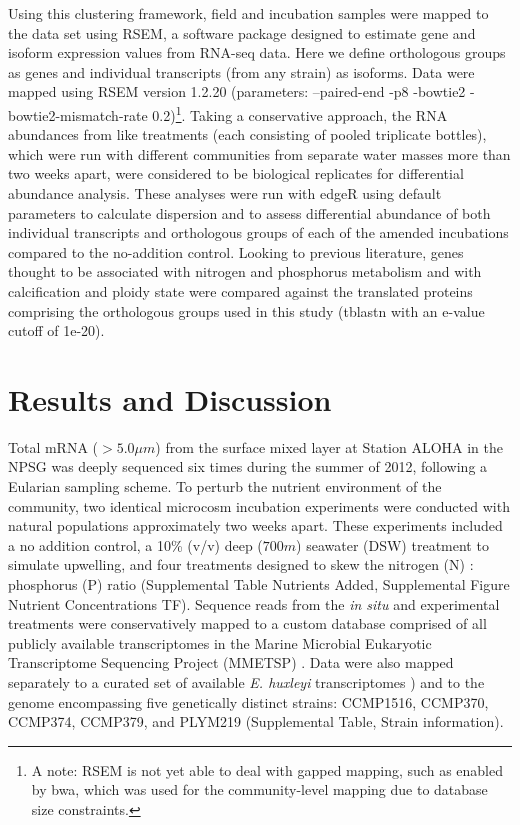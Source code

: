 Using this clustering framework, field and incubation samples were mapped to the data set using RSEM, a software package designed to estimate gene and isoform expression values from RNA-seq data. Here we define orthologous groups as genes and individual transcripts (from any strain) as isoforms. Data were mapped using RSEM version 1.2.20 (parameters: --paired-end -p8 -bowtie2 -bowtie2-mismatch-rate 0.2)\footnote{A note: RSEM is not yet able to deal with gapped mapping, such as enabled by bwa, which was used for the community-level mapping due to database size constraints.}. Taking a conservative approach, the RNA abundances from like treatments (each consisting of pooled triplicate bottles), which were run with different communities from separate water masses more than two weeks apart, were considered to be biological replicates for differential abundance analysis. These analyses were run with edgeR using default parameters to calculate dispersion and to assess differential abundance of both individual transcripts and orthologous groups of each of the amended incubations compared to the no-addition control. Looking to previous literature, genes thought to be associated with nitrogen and phosphorus metabolism \citep{Dyhrman2006, Rokitta2014, McKew2015} and with calcification and ploidy state \citep{VonDassow2009, Mackinder2011, Frada2012} were compared against the translated proteins comprising the orthologous groups used in this study (tblastn with an e-value cutoff of 1e-20).\par



\section{Results and Discussion}

Total mRNA ($>5.0 \mu m$) from the surface mixed layer at Station ALOHA in the NPSG was deeply sequenced six times during the summer of 2012, following a Eularian sampling scheme. To perturb the nutrient environment of the community, two identical microcosm incubation experiments were conducted with natural populations approximately two weeks apart. These experiments included a no addition control, a 10\% (v/v) deep ($700m$) seawater (DSW) treatment to simulate upwelling, and four treatments designed to skew the nitrogen (N) : phosphorus (P) ratio (Supplemental Table Nutrients Added, Supplemental Figure Nutrient Concentrations TF). Sequence reads from the \textit{in situ} and experimental treatments were conservatively mapped to a custom database comprised of all publicly available transcriptomes in the Marine Microbial Eukaryotic Transcriptome Sequencing Project (MMETSP) \citep{Keeling2014}. Data were also mapped separately to a curated set of available \textit{E. huxleyi} transcriptomes \citep{Keeling2014}) and to the genome \citep{Read2013} encompassing five genetically distinct strains: CCMP1516, CCMP370, CCMP374, CCMP379, and PLYM219 (Supplemental Table, Strain information).\par


